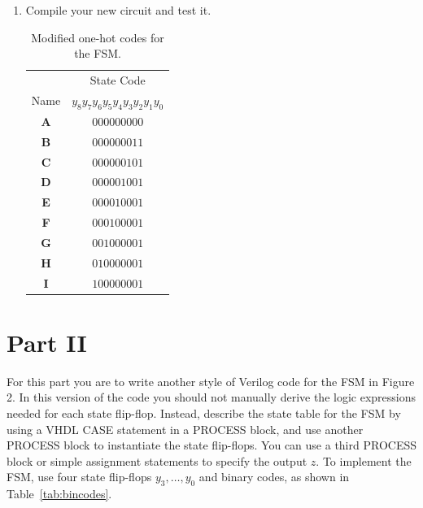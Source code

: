 \documentclass[epsfig,10pt,fullpage]{article}
\begin{document}
\begin{enumerate}
\item Compile your new circuit and test it.


\begin{table}[H]
\begin{center}
\begin{tabular}{c|c}
~ & State Code \\ 
Name & $y_8 y_7 y_6 y_5 y_4 y_3 y_2 y_1 y_0$ \\ \hline
\rule[-0.075in]{0in}{0.25in}{\bf A} & $000000000$ \\ 
{\bf B} & $000000011$ \\ 
{\bf C} & $000000101$ \\ 
{\bf D} & $000001001$ \\ 
{\bf E} & $000010001$ \\ 
{\bf F} & $000100001$ \\ 
{\bf G} & $001000001$ \\ 
{\bf H} & $010000001$ \\ 
{\bf I} & $100000001$ \\
\end{tabular}
\end{center}
\caption{Modified one-hot codes for the FSM.}
\label{tab:modified_state_assignment}
\end{table}

\end{enumerate}

\section*{Part II}
For this part you are to write another style of Verilog code for the FSM in Figure 2. In
this version of the code you should not manually derive the logic expressions needed for
each state flip-flop. Instead, describe the state table for the FSM by using a
VHDL CASE statement in a PROCESS block, and use another PROCESS block to
instantiate the state flip-flops. You can use a third PROCESS block or simple assignment
statements to specify the output $z$. To implement the FSM, use four state flip-flops
$y_3, \ldots, y_0$ and binary codes, as shown in Table~\ref{tab:bincodes}.
\end{document}
